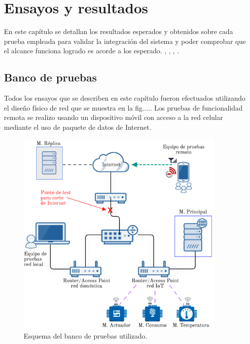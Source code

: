 
\chapter{Ensayos y resultados} %

\label{Chapter4} %


En este capítulo se detallan los resultados esperados y obtenidos sobre cada prueba empleada para validar la integración del sistema y poder comprobar que el alcance funciona logrado es acorde a los esperado.
\citep{ARTICLE:1}, \citep{BOOK:1}, \citep{BOOK:2}, \citep{WEBSITE:1}.
\section{Banco de pruebas}

Todos los ensayos que se describen en este capítulo fueron efectuados utilizando el diseño físico de red que se muestra en la fig.....  Los pruebas de funcionalidad remota se realizo usando un dispositivo móvil con acceso a la red celular mediante el uso de paquete de datos de Internet.

\begin{figure}[htbp]
	\centering
	\includegraphics[width=0.91\textwidth]{./Figures/banco2.png}
	\caption{Esquema del banco de pruebas utilizado.}

	\label{fig:banco}
\end{figure}


